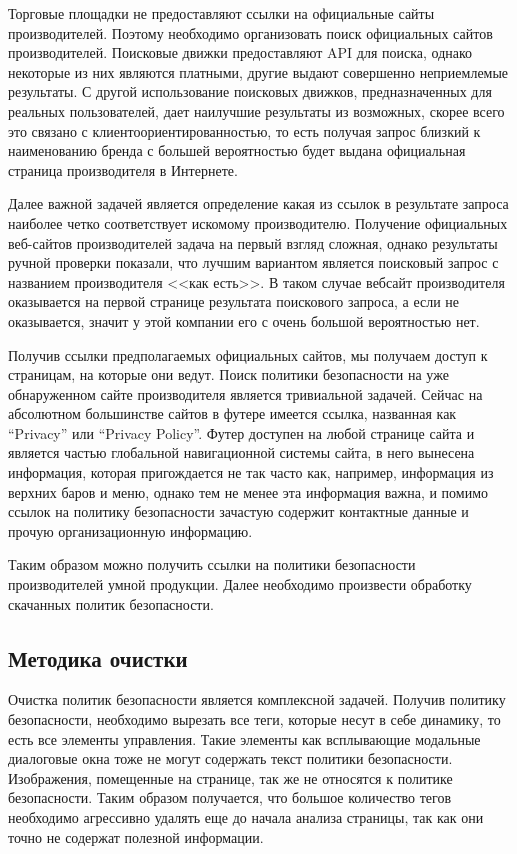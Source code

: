 \documentclass[../main]{subfiles}
\begin{document}
Торговые площадки не предоставляют ссылки на официальные сайты производителей. Поэтому необходимо организовать поиск официальных сайтов производителей. Поисковые движки предоставляют API для поиска, однако некоторые из них являются платными, другие выдают совершенно неприемлемые результаты. С другой использование поисковых движков, предназначенных для реальных пользователей, дает наилучшие результаты из возможных, скорее всего это связано с клиентоориентированностью, то есть получая запрос близкий к наименованию бренда с большей вероятностью будет выдана официальная страница производителя в Интернете.

Далее важной задачей является определение какая из ссылок в результате запроса наиболее четко соответствует искомому производителю. Получение официальных веб-сайтов производителей задача на первый взгляд сложная, однако результаты ручной проверки показали, что лучшим вариантом является поисковый запрос с названием производителя <<как есть>>. В таком случае вебсайт производителя оказывается на первой странице результата поискового запроса, а если не оказывается, значит у этой компании его с очень большой вероятностью нет. 

Получив ссылки предполагаемых официальных сайтов, мы получаем доступ к страницам, на которые они ведут. Поиск политики безопасности на уже обнаруженном сайте производителя является тривиальной задачей. Сейчас на абсолютном большинстве сайтов в футере имеется ссылка, названная как “Privacy” или “Privacy Policy”. Футер доступен на любой странице сайта и является частью глобальной навигационной системы сайта, в него вынесена информация, которая пригождается не так часто как, например, информация из верхних баров и меню, однако тем не менее эта информация важна, и помимо ссылок на политику безопасности зачастую содержит контактные данные и прочую организационную информацию.

Таким образом можно получить ссылки на политики безопасности производителей умной продукции. Далее необходимо произвести обработку скачанных политик безопасности.

\subsection{Методика очистки}

Очистка политик безопасности является комплексной задачей. Получив политику безопасности, необходимо вырезать все теги, которые несут в себе динамику, то есть все элементы управления. Такие элементы как всплывающие модальные диалоговые окна тоже не могут содержать текст политики безопасности. Изображения, помещенные на странице, так же не относятся к политике безопасности. Таким образом получается, что большое количество тегов необходимо агрессивно удалять еще до начала анализа страницы, так как они точно не содержат полезной информации.
\end{document}
